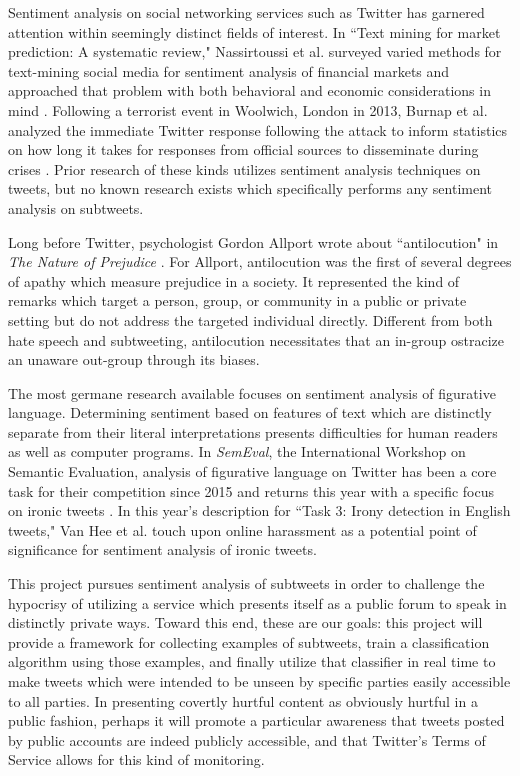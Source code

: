 \documentclass[11pt, twoside, reqno]{book}
\begin{document}
Sentiment analysis on social networking services such as Twitter has garnered attention within seemingly distinct fields of interest. In ``Text mining for market prediction: A systematic review," Nassirtoussi et al. surveyed varied methods for text-mining social media for sentiment analysis of financial markets and approached that problem with both behavioral and economic considerations in mind \cite{sentiment_analysis_markets}. Following a terrorist event in Woolwich, London in 2013, Burnap et al. analyzed the immediate Twitter response following the attack to inform statistics on how long it takes for responses from official sources to disseminate during crises \cite{sentiment_analysis_terrorism}. Prior research of these kinds utilizes sentiment analysis techniques on tweets, but no known research exists which specifically performs any sentiment analysis on subtweets. 

Long before Twitter, psychologist Gordon Allport wrote about ``antilocution" in \textit{The Nature of Prejudice} \cite{antilocution}. For Allport, antilocution was the first of several degrees of apathy which measure prejudice in a society. It represented the kind of remarks which target a person, group, or community in a public or private setting but do not address the targeted individual directly. Different from both hate speech and subtweeting, antilocution necessitates that an in-group ostracize an unaware out-group through its biases.

The most germane research available focuses on sentiment analysis of figurative language. Determining sentiment based on features of text which are distinctly separate from their literal interpretations presents difficulties for human readers as well as computer programs. In \textit{SemEval}, the International Workshop on Semantic Evaluation, analysis of figurative language on Twitter has been a core task for their competition since 2015 \cite{semeval_2015} and returns this year with a specific focus on ironic tweets \cite{semeval_2018}. In this year's description for ``Task 3: Irony detection in English tweets," Van Hee et al. touch upon online harassment as a potential point of significance for sentiment analysis of ironic tweets.  

This project pursues sentiment analysis of subtweets in order to challenge the hypocrisy of utilizing a service which presents itself as a public forum to speak in distinctly private ways. Toward this end, these are our goals: this project will provide a framework for collecting examples of subtweets, train a classification algorithm using those examples, and finally utilize that classifier in real time to make tweets which were intended to be unseen by specific parties easily accessible to all parties. In presenting covertly hurtful content as obviously hurtful in a public fashion, perhaps it will promote a particular awareness that tweets posted by public accounts are indeed publicly accessible, and that Twitter's Terms of Service \cite{twitter_tos} allows for this kind of monitoring. 
\end{document}

